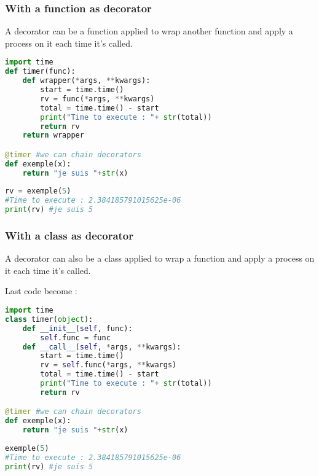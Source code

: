 \documentclass[a4paper, 12pt, titlepage]{scrartcl} %
\begin{document}
\subsubsection{With a function as decorator}
A decorator can be a function applied to wrap another function and apply a process on it each time it's called.
\begin{lstlisting}[language=Python]
import time
def timer(func):
	def wrapper(*args, **kwargs):
		start = time.time()
		rv = func(*args, **kwargs)
		total = time.time() - start
		print("Time to execute : "+ str(total))
		return rv
	return wrapper

@timer #we can chain decorators
def exemple(x):
	return "je suis "+str(x)
	
rv = exemple(5)
#Time to execute : 2.384185791015625e-06
print(rv) #je suis 5
\end{lstlisting} \vspace{5mm}

\subsubsection{With a class as decorator}
A decorator can also be a class applied to wrap a function and apply a process on it each time it's called.

Last code become :
\begin{lstlisting}[language=Python]
import time
class timer(object):
    def __init__(self, func):
        self.func = func
    def __call__(self, *args, **kwargs):
        start = time.time()
		rv = self.func(*args, **kwargs)
		total = time.time() - start
		print("Time to execute : "+ str(total))
		return rv

@timer #we can chain decorators
def exemple(x):
	return "je suis "+str(x)
	
exemple(5)
#Time to execute : 2.384185791015625e-06
print(rv) #je suis 5
\end{lstlisting} \vspace{5mm}
\end{document}
